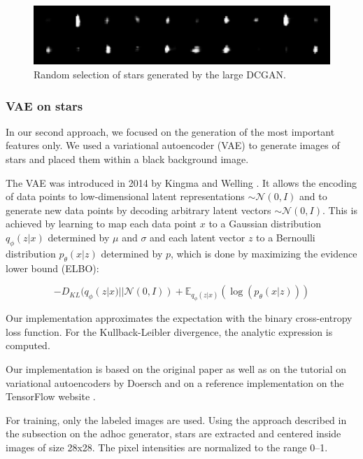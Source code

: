 \documentclass[10pt,conference,compsocconf]{IEEEtran}
\begin{document}
\begin{figure}
    \centering
    \includegraphics[width=\columnwidth]{assets/star_ensemble_large_resized.png}
    \caption{Random selection of stars generated by the large DCGAN.}
    \label{fig:dcgan_stars}
\end{figure}

\subsubsection{VAE on stars} %
In our second approach, we focused on the generation of the most important features only. We used a variational autoencoder (VAE) to generate images of stars and placed them within a black background image.

The VAE was introduced in 2014 by Kingma and Welling \cite{DBLP:journals/corr/KingmaW13}. It allows the encoding of data points to low-dimensional latent representations  $\sim\mathcal{N}(0, I)$ and to generate new data points by decoding arbitrary latent vectors $\sim\mathcal{N}(0, I)$. This is achieved by learning to map each data point $x$ to a Gaussian distribution $q_{\phi}(z|x)$ determined by $\mu$ and $\sigma$ and each latent vector $z$ to a Bernoulli distribution $p_{\theta}(x|z)$ determined by $p$, which is done by maximizing the evidence lower bound (ELBO):

\[
    -D_{KL}(q_{\phi}(z|x)||\mathcal{N}(0, I)) + \mathbb{E}_{q_{\phi}(z|x)}(\log(p_{\theta}(x|z)))
\]

Our implementation approximates the expectation with the binary cross-entropy loss function. For the Kullback-Leibler divergence, the analytic expression is computed.

Our implementation is based on the original paper as well as on the tutorial on variational autoencoders by Doersch \cite{doersch2016tutorial} and on a reference implementation on the TensorFlow website \cite{cvaetf}. 

For training, only the labeled images are used. Using the approach described in the subsection on the adhoc generator, stars are extracted and centered inside images of size \SI{28}{}x\SI{28}{}. The pixel intensities are normalized to the range \SIrange{0}{1}{}. 
\end{document}
